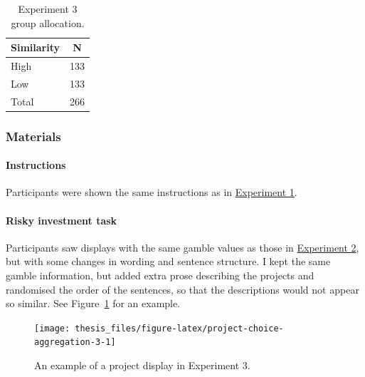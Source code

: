 \documentclass[a4paper, nobind, dvipsnames]{templates/ociamthesis}
\theoremstyle{definition}
\theoremstyle{definition}
\theoremstyle{definition}
\theoremstyle{definition}
\theoremstyle{remark}
\begin{document}
\begin{table}[tbp]

\begin{center}
\begin{threeparttable}

\caption{\label{tab:condition-allocation-aggregation-3}Experiment 3 group allocation.}

\begin{tabular}{ll}
\toprule
Similarity & \multicolumn{1}{c}{N}\\
\midrule
High & 133\\
Low & 133\\
Total & 266\\
\bottomrule
\end{tabular}

\end{threeparttable}
\end{center}

\end{table}

\subsubsection{Materials}

\paragraph{Instructions}

Participants were shown the same instructions as in
\protect\hyperlink{instructions-materials-aggregation-1}{Experiment 1}.

\hypertarget{task-aggregation-3}{%
\paragraph{Risky investment task}\label{task-aggregation-3}}

Participants saw displays with the same gamble values as those in
\protect\hyperlink{task-aggregation-2}{Experiment 2}, but with some changes in wording and
sentence structure. I kept the same gamble information, but added extra prose
describing the projects and randomised the order of the sentences, so that the
descriptions would not appear so similar. See
Figure~\ref{fig:project-choice-aggregation-3} for an example.



\begin{figure}
\texttt{[image: thesis\_files/figure-latex/project-choice-aggregation-3-1]} \caption{An example of a project display in Experiment 3.}\label{fig:project-choice-aggregation-3}
\end{figure}
\end{document}
